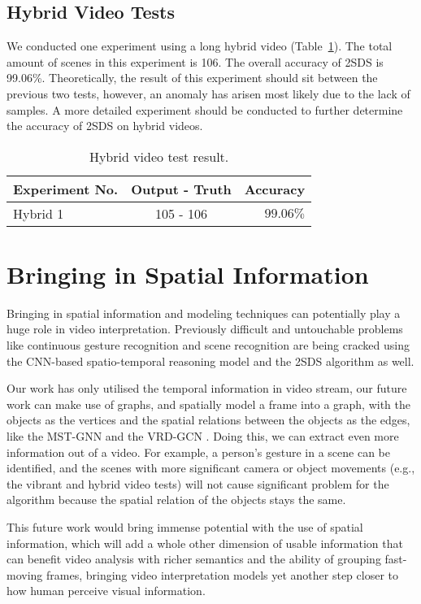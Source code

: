 \documentclass[
twocolumn,
]{ceurart}
\begin{document}
\subsection{Hybrid Video Tests}
We conducted one experiment using a long hybrid video (Table~\ref{tab:hybrid}). The total amount of scenes in this experiment is 106. The overall accuracy of 2SDS is 99.06\%. Theoretically, the result of this experiment should sit between the previous two tests, however, an anomaly has arisen most likely due to the lack of samples. A more detailed experiment should be conducted to further determine the accuracy of 2SDS on hybrid videos.

\begin{table}
  \caption{Hybrid video test result.}
  \label{tab:hybrid}
  \begin{tabular}{lcr}
    \toprule
    Experiment No.&	Output - Truth&	Accuracy\\
    \midrule
    Hybrid 1 & 105 - 106 &	$99.06\%$\\
  \bottomrule
\end{tabular}
\end{table}

\section{Bringing in Spatial Information}
Bringing in spatial information and modeling techniques can potentially play a huge role in video interpretation. Previously difficult and untouchable problems like continuous gesture recognition and scene recognition are being cracked using the CNN-based spatio-temporal reasoning model \cite{DBLP:journals/corr/abs-1909-05165} and the 2SDS algorithm as well.

Our work has only utilised the temporal information in video stream, our future work can make use of graphs, and spatially model a frame into a graph, with the objects as the vertices and the spatial relations between the objects as the edges, like the MST-GNN \cite{DBLP:journals/tip/LiCZZWT21} and the VRD-GCN \cite{DBLP:conf/mm/QianZLXP019}. Doing this, we can extract even more information out of a video. For example, a person's gesture in a scene can be identified, and the scenes with more significant camera or object movements (e.g., the vibrant and hybrid video tests) will not cause significant problem for the algorithm because the spatial relation of the objects stays the same.

This future work would bring immense potential with the use of spatial information, which will add a whole other dimension of usable information that can benefit video analysis with richer semantics and the ability of grouping fast-moving frames, bringing video interpretation models yet another step closer to how human perceive visual information.
\end{document}

